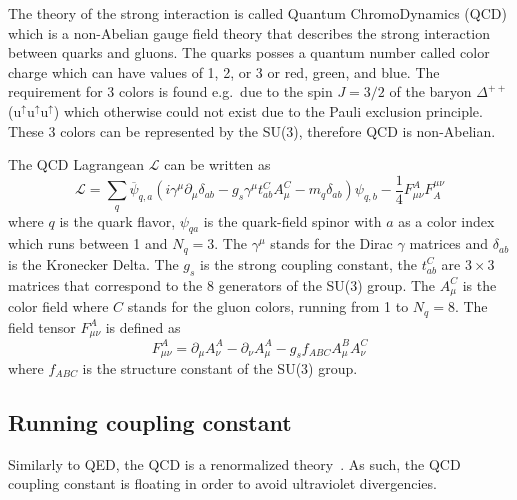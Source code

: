 The theory of the strong interaction is called Quantum ChromoDynamics (QCD) which is a non-Abelian gauge field theory that describes the strong interaction between quarks and gluons. The quarks posses a quantum number called color charge which can have values of 1, 2, or 3 or red, green, and blue. The requirement for 3 colors is found e.g.\ due to the spin $J = 3/2$ of the baryon $\Delta^{++}$ (u$^\uparrow$u$^\uparrow$u$^\uparrow$) which otherwise could not exist due to the Pauli exclusion principle. These 3 colors can be represented by the SU(3), therefore QCD is non-Abelian.

The QCD Lagrangean $\mathcal{L}$ can be written as
\begin{equation}
 \mathcal{L} = \sum_{q}\overline{\psi}_{q,a}(i\gamma^\mu \partial_\mu \delta_{ab} - g_s \gamma^\mu t_{ab}^CA_\mu^C - m_q\delta_{ab})\psi_{q,b} - \frac{1}{4}F_{\mu\nu}^AF^{\mu\nu}_A
\end{equation}
where $q$ is the quark flavor, $\psi_{qa}$ is the quark-field spinor with $a$ as a color index which runs between 1 and $N_q = 3$\@. The $\gamma^\mu$ stands for the Dirac $\gamma$ matrices and $\delta_{ab}$ is the Kronecker Delta. The $g_s$ is the strong coupling constant, the $t_{ab}^C$ are $3\times3$ matrices that correspond to the 8 generators of the SU(3) group. The $A_\mu^C$ is the color field where $C$ stands for the gluon colors, running from 1 to $N_q=8$\@. The field tensor $F^A_{\mu\nu}$ is defined as
\begin{equation}
 F_{\mu\nu}^A = \partial_\mu A^A_\nu - \partial_\nu A^A_\mu - g_s f_{ABC} A^B_\mu A_\nu^C
\end{equation}
where $f_{ABC}$ is the structure constant of the SU(3) group.


\subsection{Running coupling constant}
Similarly to QED, the QCD is a renormalized theory~\cite{renormalizationTHOOFT,renormalizationBOLLINI}\@. As such, the QCD coupling constant is floating in order to avoid ultraviolet divergencies.


